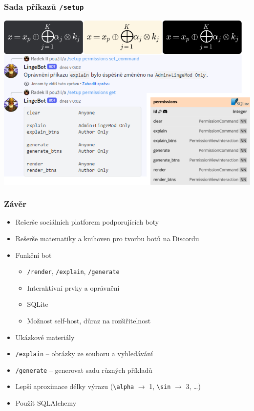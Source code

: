 \documentclass[FM]{tulpresentation}
\begin{document}
	\begin{frame}[plain]\frametitle{Sada příkazů \texttt{/setup}}
		\includegraphics[width=.95\paperwidth]{img/idk7}
	\end{frame}
	
	\begin{frame}\frametitle{Závěr}
		\begin{itemize}
			\item Rešerše sociálních platforem podporujících boty
			\item Rešerše matematiky a knihoven pro tvorbu botů na Discordu
			\item Funkční bot
			\begin{itemize}
				\item \texttt{/render}, \texttt{/explain}, \texttt{/generate}
				\item Interaktivní prvky a oprávnění
				\item SQLite
				\item Možnost self-host, důraz na rozšiřitelnost
			\end{itemize}
			\item Ukázkové materiály
		\end{itemize}
		\begin{itemize}
			\item \texttt{/explain} – obrázky ze souboru a vyhledávání
			\item \texttt{/generate} – generovat sadu různých příkladů
			\item Lepší aproximace délky výrazu (\texttt{\textbackslash alpha} $\to$ 1, \texttt{\textbackslash sin} $\to$ 3, \dots)
			\item Použít SQLAlchemy
		\end{itemize}
	\end{frame}
	
\end{document}
